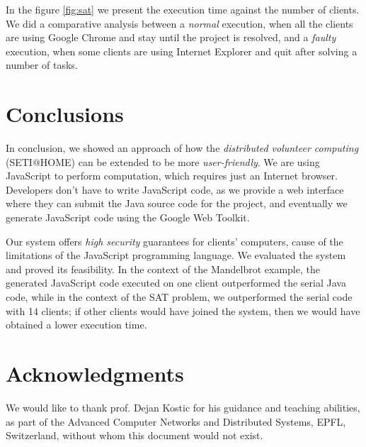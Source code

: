 \documentclass[letterpaper,twocolumn,10pt]{article}
\begin{document}
In the figure \ref{fig:sat} we present the execution time against the number of
clients. We did a comparative analysis between a \textit{normal} execution, when
all the clients are using Google Chrome and stay until the project is resolved,
and a \textit{faulty} execution, when some clients are using Internet Explorer
and quit after solving a number of tasks.

\section{Conclusions}
\label{conclusions}

In conclusion, we showed an approach of how the \textit{distributed volunteer
computing} (SETI@HOME) can be extended to be more \textit{user-friendly}. We
are using JavaScript to perform computation, which requires just an Internet
browser. Developers don't have to write JavaScript code, as we provide a web
interface where they can submit the Java source code for the project, and
eventually we generate JavaScript code using the Google Web Toolkit.

Our system offers \textit{high security} guarantees for clients' computers,
cause of the limitations of the JavaScript programming language. We evaluated the system and
proved its feasibility. In the context of the Mandelbrot example, the generated
JavaScript code executed on one client outperformed the serial Java code, while
in the context of the SAT problem, we outperformed the serial code with 14
clients; if other clients would have joined the system, then we would have
obtained a lower execution time.

\section{Acknowledgments}

We would like to thank prof. Dejan Kostic for his guidance and teaching
abilities, as part of the Advanced Computer Networks and Distributed Systems,
EPFL, Switzerland, without whom this document would not exist.
\end{document}
